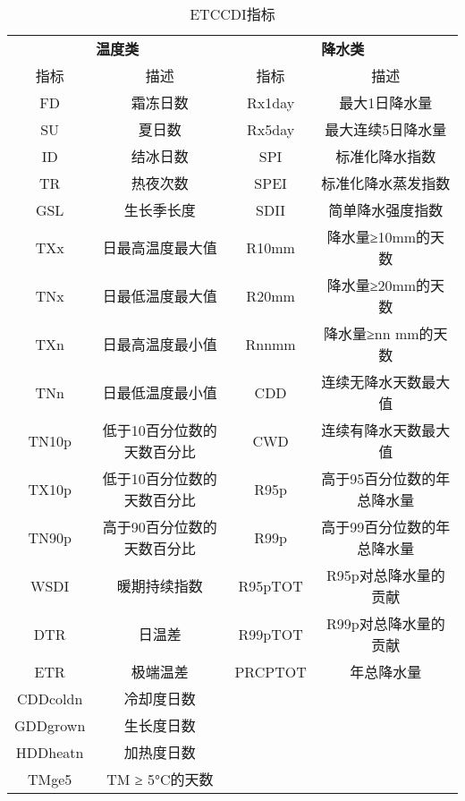 \begin{longtable}{cccc}
    \caption{ETCCDI指标}\label{tab:ETCCDI}
    \\
    \toprule
    \multicolumn{2}{c}{\textbf{温度类}} & \multicolumn{2}{c}{\textbf{降水类}} \\
    \cmidrule(rl){1-2} \cmidrule(rl){3-4}
    指标     & 描述             & 指标    & 描述             \\
    \midrule
    FD       & 霜冻日数           & Rx1day  & 最大1日降水量        \\
    SU       & 夏日数            & Rx5day  & 最大连续5日降水量      \\
    ID       & 结冰日数           & SPI     & 标准化降水指数        \\
    TR       & 热夜次数           & SPEI    & 标准化降水蒸发指数      \\
    GSL      & 生长季长度          & SDII    & 简单降水强度指数       \\
    TXx      & 日最高温度最大值       & R10mm   & 降水量≥10mm的天数    \\
    TNx      & 日最低温度最大值       & R20mm   & 降水量≥20mm的天数    \\
    TXn      & 日最高温度最小值       & Rnnmm   & 降水量≥nn mm的天数   \\
    TNn      & 日最低温度最小值       & CDD     & 连续无降水天数最大值     \\
    TN10p    & 低于10百分位数的天数百分比 & CWD     & 连续有降水天数最大值     \\
    TX10p    & 低于10百分位数的天数百分比 & R95p    & 高于95百分位数的年总降水量 \\
    TN90p    & 高于90百分位数的天数百分比 & R99p    & 高于99百分位数的年总降水量 \\
    WSDI     & 暖期持续指数         & R95pTOT & R95p对总降水量的贡献   \\
    DTR      & 日温差            & R99pTOT & R99p对总降水量的贡献   \\
    ETR      & 极端温差           & PRCPTOT & 年总降水量          \\
    CDDcoldn & 冷却度日数          &         &                \\
    GDDgrown & 生长度日数          &         &                \\
    HDDheatn & 加热度日数          &         &                \\
    TMge5    & TM ≥ 5°C的天数    &         &                \\

\end{longtable}
